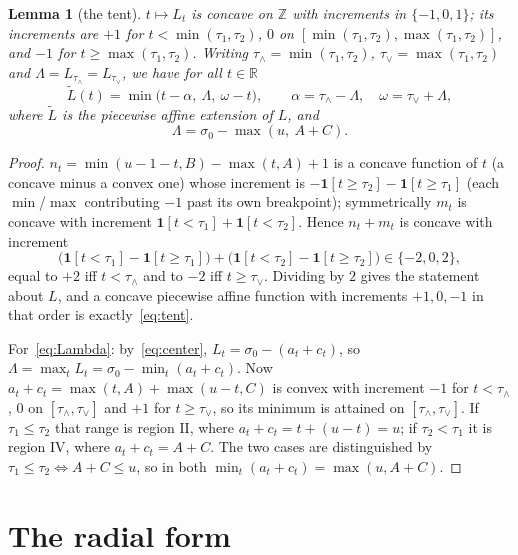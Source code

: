 \documentclass[11pt]{article}
\newtheorem{lemma}[theorem]{Lemma}
\theoremstyle{definition}
\newcommand{\Z}{\mathbb Z}
\newcommand{\R}{\mathbb R}
\begin{document}
\begin{lemma}[the tent]\label{lem:tent}
$t\mapsto L_t$ is concave on $\Z$ with increments in $\{-1,0,1\}$; its increments are $+1$
for $t<\min(\tau_1,\tau_2)$, $0$ on $[\min(\tau_1,\tau_2),\max(\tau_1,\tau_2)]$, and $-1$
for $t\ge\max(\tau_1,\tau_2)$. Writing
$\tau_\wedge=\min(\tau_1,\tau_2)$, $\tau_\vee=\max(\tau_1,\tau_2)$ and
$\Lambda=L_{\tau_\wedge}=L_{\tau_\vee}$, we have for all $t\in\R$
\begin{equation}\label{eq:tent}
  \widetilde L(t)=\min\bigl(t-\alpha,\ \Lambda,\ \omega-t\bigr),\qquad
  \alpha=\tau_\wedge-\Lambda,\quad \omega=\tau_\vee+\Lambda,
\end{equation}
where $\widetilde L$ is the piecewise affine extension of $L$, and
\begin{equation}\label{eq:Lambda}
  \Lambda=\sigma_0-\max(u,\ A+C).
\end{equation}
\end{lemma}
\begin{proof}
$n_t=\min(u-1-t,B)-\max(t,A)+1$ is a concave function of $t$ (a concave minus a convex one)
whose increment is $-\mathbf 1[t\ge\tau_2]-\mathbf 1[t\ge\tau_1]$ (each $\min$/$\max$
contributing $-1$ past its own breakpoint); symmetrically $m_t$ is concave with increment
$\mathbf 1[t<\tau_1]+\mathbf 1[t<\tau_2]$. Hence $n_t+m_t$ is concave with increment
\[
  \bigl(\mathbf 1[t<\tau_1]-\mathbf 1[t\ge\tau_1]\bigr)
 +\bigl(\mathbf 1[t<\tau_2]-\mathbf 1[t\ge\tau_2]\bigr)\in\{-2,0,2\},
\]
equal to $+2$ iff $t<\tau_\wedge$ and to $-2$ iff $t\ge\tau_\vee$. Dividing by $2$ gives the
statement about $L$, and a concave piecewise affine function with increments $+1,0,-1$ in
that order is exactly~\eqref{eq:tent}.

For~\eqref{eq:Lambda}: by~\eqref{eq:center}, $L_t=\sigma_0-(a_t+c_t)$, so
$\Lambda=\max_tL_t=\sigma_0-\min_t(a_t+c_t)$. Now
$a_t+c_t=\max(t,A)+\max(u-t,C)$ is convex with increment $-1$ for $t<\tau_\wedge$, $0$ on
$[\tau_\wedge,\tau_\vee]$ and $+1$ for $t\ge\tau_\vee$, so its minimum is attained on
$[\tau_\wedge,\tau_\vee]$. If $\tau_1\le\tau_2$ that range is region $\mathrm{II}$, where
$a_t+c_t=t+(u-t)=u$; if $\tau_2<\tau_1$ it is region $\mathrm{IV}$, where $a_t+c_t=A+C$.
The two cases are distinguished by $\tau_1\le\tau_2\iff A+C\le u$, so in both
$\min_t(a_t+c_t)=\max(u,A+C)$.
\end{proof}

\section{The radial form}\label{sec:radial}
\end{document}

